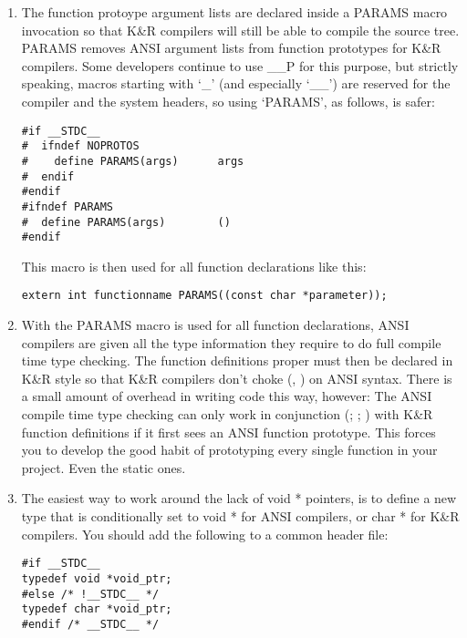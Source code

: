 \begin{enumerate}
\item The function protoype argument lists are declared inside a PARAMS macro 
invocation so that K\&R compilers will still be able to compile the 
source tree. PARAMS removes ANSI argument lists from function prototypes for 
K\&R compilers. Some developers continue to use \_{}\_{}P for this purpose,
but strictly speaking, macros starting with `\_{}' (and especially `\_{}\_{}') 
are reserved for the compiler and the system headers, so using `PARAMS',
as follows, is safer: 

\begin{Verbatim}[frame=single]
#if __STDC__
#  ifndef NOPROTOS
#    define PARAMS(args)      args
#  endif
#endif
#ifndef PARAMS
#  define PARAMS(args)        ()
#endif
\end{Verbatim}

This macro is then used for all function declarations like this: 

\begin{Verbatim}[frame=single]
extern int functionname PARAMS((const char *parameter));
\end{Verbatim}

\item With the PARAMS macro is used for all function declarations, ANSI 
compilers are given all the type information they require to do full compile 
time type checking. The function definitions proper must then be declared 
in K\&R style so that K\&R compilers don't choke ({\MfQ{}}, {\MeQ{}}) on ANSI syntax.
There is a small amount of overhead in writing code this way, however: The ANSI compile time type checking can only work in conjunction ({\McQ{}}; {\McQ{}}; {\McQ{}})
with K\&R function definitions if it first sees an ANSI function prototype.
This forces you to develop the good habit of prototyping every single 
function in your project. Even the static ones.

\item The easiest way to work around the lack of void * pointers, is to define a new type that is conditionally set to void * for ANSI compilers, or char * for K\&R compilers. You should add the following to a common header file: 

\begin{Verbatim}[frame=single]
#if __STDC__
typedef void *void_ptr;
#else /* !__STDC__ */
typedef char *void_ptr;
#endif /* __STDC__ */
\end{Verbatim}


\end{enumerate}
